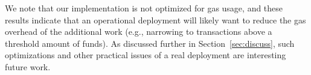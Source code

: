 We note that our implementation is not optimized for gas usage, and
these results indicate that an
operational deployment
will likely want to reduce the gas overhead of
the additional work (e.g., narrowing to transactions above a threshold
amount of funds).  As discussed further in Section~\ref{sec:discuss},
such optimizations and other practical issues of a real deployment are
interesting future work.

